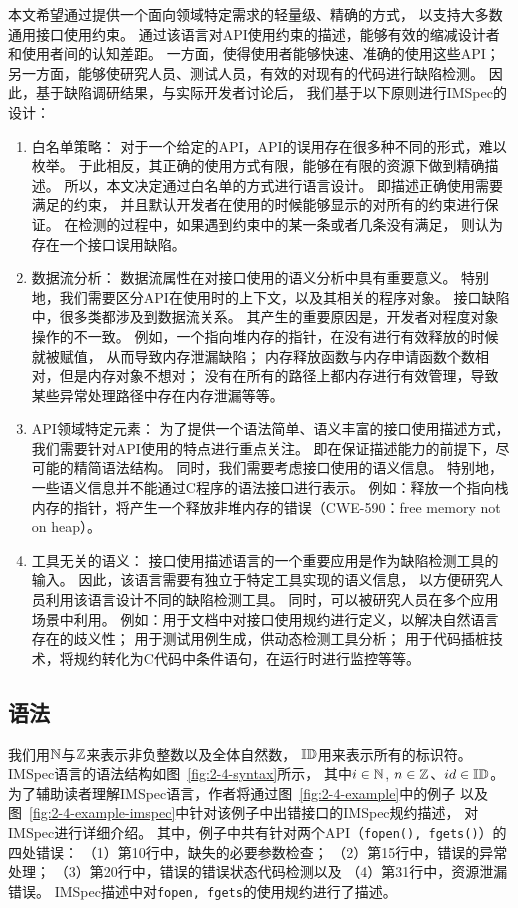 本文希望通过提供一个面向领域特定需求的轻量级、精确的方式，
以支持大多数通用接口使用约束。
通过该语言对API使用约束的描述，能够有效的缩减设计者和使用者间的认知差距。
一方面，使得使用者能够快速、准确的使用这些API；
另一方面，能够使研究人员、测试人员，有效的对现有的代码进行缺陷检测。
因此，基于缺陷调研结果，与实际开发者讨论后，
我们基于以下原则进行IMSpec的设计：
\begin{enumerate}
	\item 白名单策略：
	对于一个给定的API，API的误用存在很多种不同的形式，难以枚举。
	于此相反，其正确的使用方式有限，能够在有限的资源下做到精确描述。
	所以，本文决定通过白名单的方式进行语言设计。
	即描述正确使用需要满足的约束，
	并且默认开发者在使用的时候能够显示的对所有的约束进行保证。
	在检测的过程中，如果遇到约束中的某一条或者几条没有满足，
	则认为存在一个接口误用缺陷。
	
	\item 数据流分析：
	数据流属性在对接口使用的语义分析中具有重要意义。
	特别地，我们需要区分API在使用时的上下文，以及其相关的程序对象。
	接口缺陷中，很多类都涉及到数据流关系。
	其产生的重要原因是，开发者对程度对象操作的不一致。
	例如，一个指向堆内存的指针，在没有进行有效释放的时候就被赋值，
	从而导致内存泄漏缺陷；
	内存释放函数与内存申请函数个数相对，但是内存对象不想对；
	没有在所有的路径上都内存进行有效管理，导致某些异常处理路径中存在内存泄漏等等。
	
	\item API领域特定元素：
	为了提供一个语法简单、语义丰富的接口使用描述方式，
	我们需要针对API使用的特点进行重点关注。
	即在保证描述能力的前提下，尽可能的精简语法结构。
	同时，我们需要考虑接口使用的语义信息。
	特别地，一些语义信息并不能通过C程序的语法接口进行表示。
	例如：释放一个指向栈内存的指针，将产生一个释放非堆内存的错误（CWE-590：free memory not on heap）。
	
	\item 工具无关的语义：
	接口使用描述语言的一个重要应用是作为缺陷检测工具的输入。
	因此，该语言需要有独立于特定工具实现的语义信息，
	以方便研究人员利用该语言设计不同的缺陷检测工具。
	同时，可以被研究人员在多个应用场景中利用。
	例如：用于文档中对接口使用规约进行定义，以解决自然语言存在的歧义性；
	用于测试用例生成，供动态检测工具分析；
	用于代码插桩技术，将规约转化为C代码中条件语句，在运行时进行监控等等。
\end{enumerate}



\subsection{语法}
我们用$\mathbb{N}$与$\mathbb{Z}$来表示非负整数以及全体自然数，
$\mathbb{ID}$用来表示所有的标识符。
IMSpec语言的语法结构如图~\ref{fig:2-4-syntax}所示，
其中$i\in\mathbb{N}$, $n\in\mathbb{Z}$、$id \in \mathbb{ID}$。
为了辅助读者理解IMSpec语言，作者将通过图~\ref{fig:2-4-example}中的例子
以及图~\ref{fig:2-4-example-imspec}中针对该例子中出错接口的IMSpec规约描述，
对IMSpec进行详细介绍。
其中，例子中共有针对两个API（\texttt{fopen(), fgets()}）的四处错误：
（1）第10行中，缺失的必要参数检查；
（2）第15行中，错误的异常处理；
（3）第20行中，错误的错误状态代码检测以及
（4）第31行中，资源泄漏错误。
IMSpec描述中对\texttt{fopen, fgets}的使用规约进行了描述。

